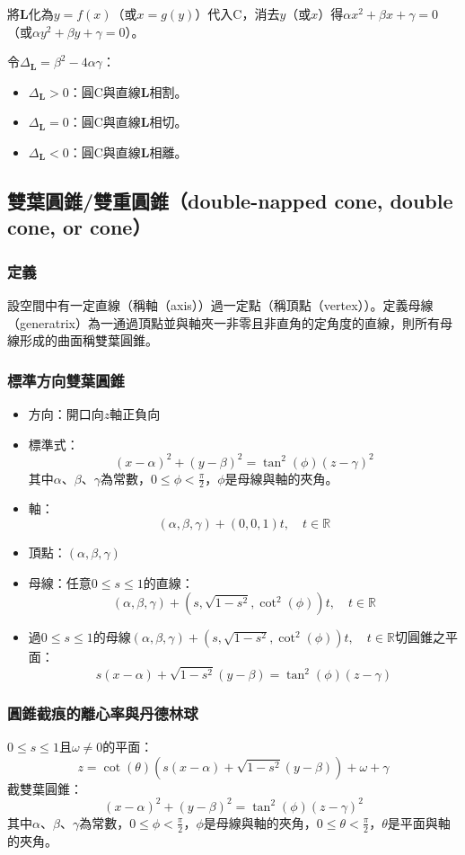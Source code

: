 \documentclass[a4paper,12pt]{report}
\begin{document}
將$\mathbf{L}$化為$y=f(x)$（或$x=g(y)$）代入$\mathrm{C}$，消去$y$（或$x$）得$\alpha x^2+\beta x+\gamma=0$（或$\alpha y^2+\beta y+\gamma=0$）。

令$\Delta_\mathbf{L}=\beta^2-4\alpha\gamma$：
\begin{itemize}
\item $\Delta_\mathbf{L}>0$：圓$\mathrm{C}$與直線$\mathbf{L}$相割。
\item $\Delta_\mathbf{L}=0$：圓$\mathrm{C}$與直線$\displaystyle\mathbf{L}$相切。
\item $\Delta_\mathbf{L}<0$：圓$\mathrm{C}$與直線$\mathbf{L}$相離。
\end{itemize}
\subsection{雙葉圓錐/雙重圓錐（double-napped cone, double cone, or cone）}
\subsubsection{定義}
設空間中有一定直線（稱軸（axis））過一定點（稱頂點（vertex））。定義母線（generatrix）為一通過頂點並與軸夾一非零且非直角的定角度的直線，則所有母線形成的曲面稱雙葉圓錐。
\subsubsection{標準方向雙葉圓錐}
\begin{itemize}
\item 方向：開口向$z$軸正負向
\item 標準式：
\[(x-\alpha)^2+(y-\beta)^2=\tan^2(\phi)(z-\gamma)^2\]
其中$\alpha$、$\beta$、$\gamma$為常數，$0\leq\phi<\frac{\pi}{2}$，$\phi$是母線與軸的夾角。
\item 軸：
\[(\alpha,\beta,\gamma)+(0,0,1)t,\quad t\in\mathbb{R}\]
\item 頂點：$(\alpha,\beta,\gamma)$
\item 母線：任意$0\leq s\leq 1$的直線：
\[(\alpha,\beta,\gamma)+\left(s,\sqrt{1-s^2},\cot^2(\phi)\right)t,\quad t\in\mathbb{R}\]
\item 過$0\leq s\leq 1$的母線$(\alpha,\beta,\gamma)+\left(s,\sqrt{1-s^2},\cot^2(\phi)\right)t,\quad t\in\mathbb{R}$切圓錐之平面：
\[s(x-\alpha)+\sqrt{1-s^2}(y-\beta)=\tan^2(\phi)(z-\gamma)\]
\end{itemize}
\subsubsection{圓錐截痕的離心率與丹德林球}
$0\leq s\leq 1$且$\omega\neq 0$的平面：
\[z=\cot(\theta)\left(s(x-\alpha)+\sqrt{1-s^2}(y-\beta)\right)+\omega+\gamma\]
截雙葉圓錐：
\[(x-\alpha)^2+(y-\beta)^2=\tan^2(\phi)(z-\gamma)^2\]
其中$\alpha$、$\beta$、$\gamma$為常數，$0\leq\phi<\frac{\pi}{2}$，$\phi$是母線與軸的夾角，$0\leq\theta<\frac{\pi}{2}$，$\theta$是平面與軸的夾角。
\end{document}
